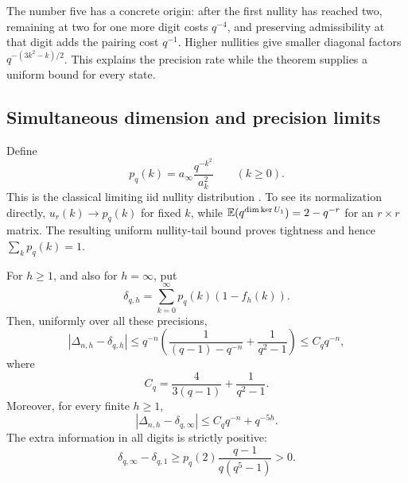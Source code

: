 The number five has a concrete origin: after the first nullity
has reached two, remaining at two for one more digit costs
\(q^{-4}\), and preserving admissibility at that digit adds
the pairing cost \(q^{-1}\).
Higher nullities give smaller diagonal factors
\(q^{-(3k^2-k)/2}\).
This explains the precision rate while the theorem supplies a
uniform bound for every state.

\subsection{Simultaneous dimension and precision limits}

Define
\[
 p_q(k)=a_\infty\frac{q^{-k^2}}{a_k^2}\qquad(k\ge0).
 \tag{L25}\label{eq:local-p}
\]
This is the classical limiting iid nullity distribution
\cite{FulmanGoldstein}. To see its normalization directly,
\(u_r(k)\to p_q(k)\) for fixed \(k\), while
\(\mathbb E(q^{\dim\ker U_1})=2-q^{-r}\) for an \(r\times r\)
matrix. The resulting uniform nullity-tail bound proves
tightness and hence \(\sum_kp_q(k)=1\).

\begin{theorem}\label{thm:local-limit}
For \(h\ge1\), and also for \(h=\infty\), put
\[
 \delta_{q,h}=\sum_{k=0}^\infty p_q(k)(1-f_h(k)).
 \tag{L26}\label{eq:local-delta-limit}
\]
Then, uniformly over all these precisions,
\[
 |\Delta_{n,h}-\delta_{q,h}|
 \le q^{-n}\left(
       \frac1{(q-1)-q^{-n}}+\frac1{q^2-1}\right)
 \le C_q q^{-n},
 \tag{L27}\label{eq:local-dimension}
\]
where
\[
 C_q=\frac4{3(q-1)}+\frac1{q^2-1}.
\]
Moreover, for every finite \(h\ge1\),
\[
 \left|\Delta_{n,h}-\delta_{q,\infty}\right|
       \le C_q q^{-n}+q^{-5h}.
 \tag{L28}\label{eq:local-two-parameter}
\]
The extra information in all digits is strictly positive:
\[
 \delta_{q,\infty}-\delta_{q,1}
 \ge p_q(2)\frac{q-1}{q(q^5-1)}>0.
 \tag{L29}\label{eq:local-strict-gap}
\]
\end{theorem}

